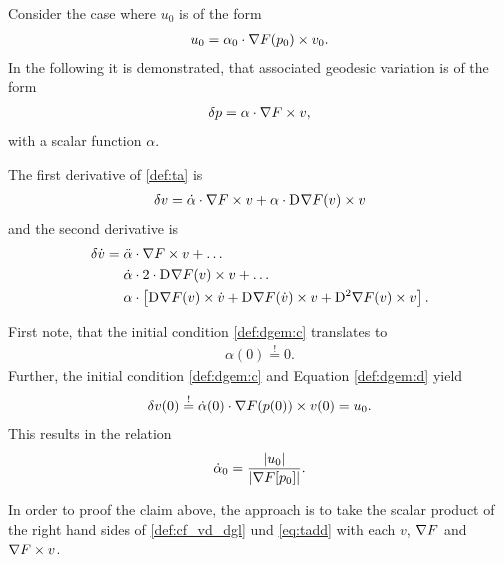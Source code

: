 Consider the case where $ u_0 $ is of the form
\begin{align}
    u_0  =  \alpha_0 \cdot \nabla F( p_0 ) \times v_0 .
\end{align}
In the following it is demonstrated,
that associated geodesic variation is of the form
\begin{align}
    \delta p  =  \alpha \cdot \nabla F  \times v ,
    \label{def:ta}
\end{align}
with a scalar function $ \alpha $.



The first derivative of \eqref{def:ta} is
\begin{align}
    \delta v  =
    \dot{ \alpha } \cdot \nabla F  \times v  +
    \alpha \cdot \mathrm{D}^{  } \nabla F  ( v ) \times v
    \label{eq:tad}
\end{align}
and the second derivative is
\begin{align}
    \vardiff \dot{ v }  &=
    \ddot{ \alpha } \mult \grad{ F } \times v  +  \dots\nonumber\\
    &\hphantom{{}={}}\dot{ \alpha } \mult 2 \mult \diff{}{ \grad{ F } }( v ) \times v  +  \dots\nonumber\\
    &\hphantom{{}={}}\alpha \mult \left[ \diff{}{ \grad{ F } }( v ) \times \dot{ v }  +
    \diff{}{ \grad{ F } }( \dot{ v } ) \times v  +  
    \diff{ 2 }{ \grad{ F } }( v ) \times v \right] .
    \label{eq:tadd}
\end{align}


First note, that the initial condition \eqref{def:dgem:c} translates to
\begin{align}
    \alpha( 0 )  \overset{!}{=}  0 .
\end{align}
Further, the initial condition \eqref{def:dgem:c}
and Equation \eqref{def:dgem:d} yield
\begin{align}
    \delta v( 0 )   \overset{!}{=}
    \dot{ \alpha }( 0 ) \cdot \nabla F( p( 0 ) ) \times v( 0 )  =  u_0 .
\end{align}
This results in the relation
\begin{align}
    \dot{ \alpha }_0   =
    \frac{ \lvert  u_0  \rvert }{ \lvert  \nabla F[ p_0 ]  \rvert } .
\end{align}


In order to proof the claim above,
the approach is to take the scalar product
of the right hand sides of \eqref{def:cf_vd_dgl} und \eqref{eq:tadd}
with each $ v $, $ \nabla F $ and $ \nabla F \times v $.


